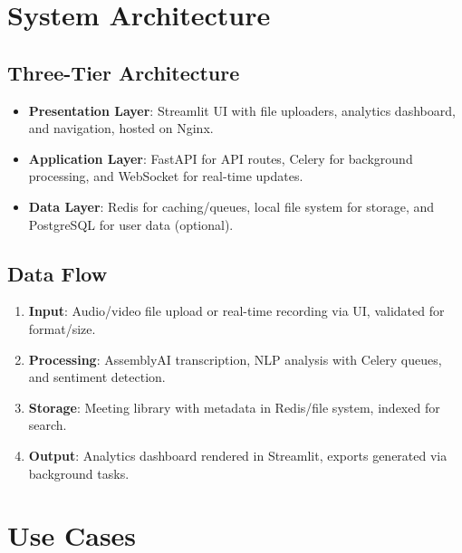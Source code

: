 \documentclass[12pt]{article}
\begin{document}
\section{System Architecture}
\subsection{Three-Tier Architecture}
\begin{itemize}
    \item \textbf{Presentation Layer}: Streamlit UI with file uploaders, analytics dashboard, and navigation, hosted on Nginx.
    \item \textbf{Application Layer}: FastAPI for API routes, Celery for background processing, and WebSocket for real-time updates.
    \item \textbf{Data Layer}: Redis for caching/queues, local file system for storage, and PostgreSQL for user data (optional).
\end{itemize}

\subsection{Data Flow}
\begin{enumerate}
    \item \textbf{Input}: Audio/video file upload or real-time recording via UI, validated for format/size.
    \item \textbf{Processing}: AssemblyAI transcription, NLP analysis with Celery queues, and sentiment detection.
    \item \textbf{Storage}: Meeting library with metadata in Redis/file system, indexed for search.
    \item \textbf{Output}: Analytics dashboard rendered in Streamlit, exports generated via background tasks.
\end{enumerate}

\section{Use Cases}
\end{document}
